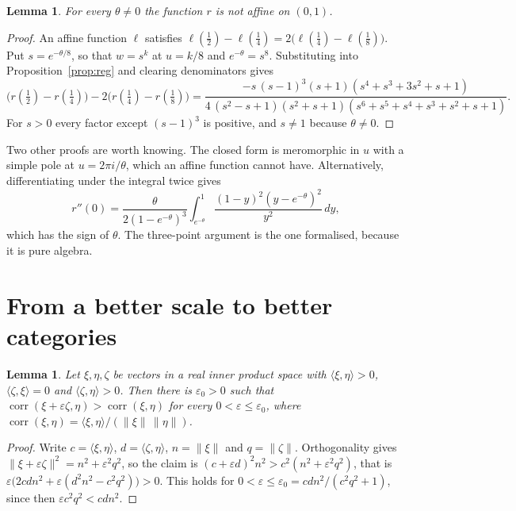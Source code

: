 \documentclass[11pt]{amsart}
\newtheorem{lemma}[thm]{Lemma}
\theoremstyle{definition}
\DeclareMathOperator{\corr}{corr}
\begin{document}
\begin{lemma}\label{lem:notaffine}
For every $\theta\ne0$ the function $r$ is not affine on $(0,1)$.
\end{lemma}

\begin{proof}
An affine function $\ell$ satisfies $\ell(\tfrac12)-\ell(\tfrac14)=2\bigl(\ell(\tfrac14)-\ell(\tfrac18)\bigr)$.
Put $s=e^{-\theta/8}$, so that $w=s^k$ at $u=k/8$ and $e^{-\theta}=s^8$. Substituting into
Proposition~\ref{prop:reg} and clearing denominators gives
\[
\bigl(r(\tfrac12)-r(\tfrac14)\bigr)-2\bigl(r(\tfrac14)-r(\tfrac18)\bigr)
=\frac{-s\,(s-1)^3(s+1)(s^4+s^3+3s^2+s+1)}{4\,(s^2-s+1)(s^2+s+1)(s^6+s^5+s^4+s^3+s^2+s+1)}.
\]
For $s>0$ every factor except $(s-1)^3$ is positive, and $s\ne1$ because $\theta\ne0$.
\end{proof}

Two other proofs are worth knowing. The closed form is meromorphic in $u$ with a simple pole at $u=2\pi i/\theta$,
which an affine function cannot have. Alternatively, differentiating under the integral twice gives
\[
r''(0)=\frac{\theta}{2(1-e^{-\theta})^3}\int_{e^{-\theta}}^1\frac{(1-y)^2(y-e^{-\theta})^2}{y^2}\,dy,
\]
which has the sign of $\theta$. The three-point argument is the one formalised, because it is pure algebra.

\section{From a better scale to better categories}

\begin{lemma}\label{lem:var}
Let $\xi,\eta,\zeta$ be vectors in a real inner product space with $\langle\xi,\eta\rangle>0$,
$\langle\zeta,\xi\rangle=0$ and $\langle\zeta,\eta\rangle>0$. Then there is $\varepsilon_0>0$ such that
$\corr(\xi+\varepsilon\zeta,\eta)>\corr(\xi,\eta)$ for every $0<\varepsilon\le\varepsilon_0$, where
$\corr(\xi,\eta)=\langle\xi,\eta\rangle/(\|\xi\|\,\|\eta\|)$.
\end{lemma}

\begin{proof}
Write $c=\langle\xi,\eta\rangle$, $d=\langle\zeta,\eta\rangle$, $n=\|\xi\|$ and $q=\|\zeta\|$. Orthogonality gives
$\|\xi+\varepsilon\zeta\|^2=n^2+\varepsilon^2q^2$, so the claim is $(c+\varepsilon d)^2n^2>c^2(n^2+\varepsilon^2q^2)$,
that is $\varepsilon\bigl(2cdn^2+\varepsilon(d^2n^2-c^2q^2)\bigr)>0$. This holds for
$0<\varepsilon\le\varepsilon_0=cdn^2/(c^2q^2+1)$, since then $\varepsilon c^2q^2<cdn^2$.
\end{proof}
\end{document}
